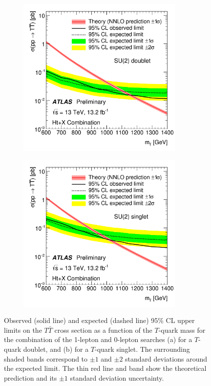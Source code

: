 \begin{figure}[h!]
\begin{subfigure}{0.5\textwidth}
  \centering
  \includegraphics[width=0.9\textwidth]{figures/VLQ/fig_16a.png}
  \caption{}
  \label{}
\end{subfigure}
\begin{subfigure}{0.5\textwidth}
  \centering
  \includegraphics[width=0.9\textwidth]{figures/VLQ/fig_16b.png}
  \caption{}
  \label{}
\end{subfigure}
\captionsetup{width=0.85\textwidth} \caption{\small Observed (solid line) and expected (dashed line) 95\% CL upper limits on the $T\bar{T}$ cross section as a function of the $T$-quark mass 
for the combination of the 1-lepton and 0-lepton searches (a) for a $T$-quark doublet, and (b) for a $T$-quark singlet.
The surrounding shaded bands correspond to $\pm1$ and $\pm2$ standard deviations around the expected limit. 
The thin red line and band show the theoretical prediction and its $\pm1$ standard deviation uncertainty.}
\label{sec:vlq:fig:singdoub}
\end{figure}

